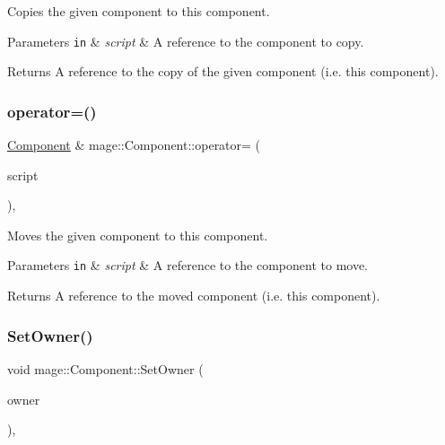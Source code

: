Copies the given component to this component.


\begin{DoxyParams}[1]{Parameters}
\mbox{\tt in}  & {\em script} & A reference to the component to copy. \\
\hline
\end{DoxyParams}
\begin{DoxyReturn}{Returns}
A reference to the copy of the given component (i.\+e. this component). 
\end{DoxyReturn}
\hypertarget{classmage_1_1_component_a0a03d80d37a6fa38616b955890471e06}{}\label{classmage_1_1_component_a0a03d80d37a6fa38616b955890471e06} 
\subsubsection{\texorpdfstring{operator=()}{operator=()}\hspace{0.1cm}{\footnotesize\ttfamily [2/2]}}
{\footnotesize\ttfamily \hyperlink{classmage_1_1_component}{Component} \& mage\+::\+Component\+::operator= (\begin{DoxyParamCaption}\item[{\hyperlink{classmage_1_1_component}{Component} \&\&}]{script }\end{DoxyParamCaption})\hspace{0.3cm}{\ttfamily [default]}, {\ttfamily [noexcept]}}

Moves the given component to this component.


\begin{DoxyParams}[1]{Parameters}
\mbox{\tt in}  & {\em script} & A reference to the component to move. \\
\hline
\end{DoxyParams}
\begin{DoxyReturn}{Returns}
A reference to the moved component (i.\+e. this component). 
\end{DoxyReturn}
\hypertarget{classmage_1_1_component_aed5c7f7af79357f708c71572d7d99638}{}\label{classmage_1_1_component_aed5c7f7af79357f708c71572d7d99638} 
\subsubsection{\texorpdfstring{Set\+Owner()}{SetOwner()}}
{\footnotesize\ttfamily void mage\+::\+Component\+::\+Set\+Owner (\begin{DoxyParamCaption}\item[{\hyperlink{classmage_1_1_proxy_ptr}{Proxy\+Ptr}$<$ \hyperlink{classmage_1_1_node}{Node} $>$}]{owner }\end{DoxyParamCaption})\hspace{0.3cm}{\ttfamily [private]}, {\ttfamily [noexcept]}}

